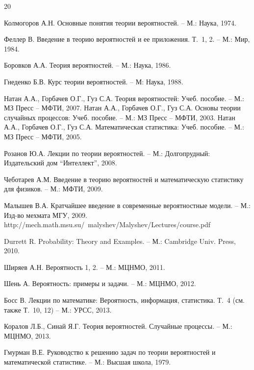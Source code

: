 \newpage


\renewcommand\refname{Литература}
\makeatletter
\renewcommand{\@biblabel}[1]{#1.}
\makeatother

\begin{thebibliography} {20}


Колмогоров А.Н. Основные понятия теории вероятностей. – М.: Наука, 1974. 

Феллер В. Введение в теорию вероятностей и ее приложения. Т.~1, 2. – М.: Мир, 1984.

Боровков А.А. Теория вероятностей. – М.: Наука, 1986.

Гнеденко Б.В. Курс теории вероятностей. – М: Наука, 1988.

Натан А.А., Горбачев О.Г., Гуз С.А. Теория вероятностей: Учеб. пособие. – М.: МЗ Пресс – МФТИ, 2007. 
Натан А.А., Горбачев О.Г., Гуз С.А.  Основы теории случайных процессов: Учеб. пособие. – М.: МЗ Пресс – МФТИ, 2003.
Натан А.А., Горбачев О.Г., Гуз С.А. Математическая статистика: Учеб. пособие. – М.: МЗ Пресс – МФТИ, 2005.

Розанов Ю.А. Лекции по теории вероятностей. – М.: Долгопрудный: Издательский дом “Интеллект”, 2008. 



Чеботарев А.М.  Введение в теорию вероятностей и математическую статистику для физиков. – М.: МФТИ, 2009.

Малышев В.А. Кратчайшее введение в современные вероятностные модели. – М.: Изд-во мехмата МГУ, 2009. 
{\small http://mech.math.msu.su/~malyshev/Malyshev/Lectures/course.pdf}

 \label{durrett}
Durrett R. Probability: Theory and Examples. – М.: Cambridge Univ. Press, 2010.

 \label{chiraiev}
Ширяев А.Н. Вероятность 1, 2. – М.: МЦНМО, 2011.

Шень А. Вероятность: примеры и задачи. – М.: МЦНМО, 2012.

Босс В. Лекции по математике: Вероятность, информация, статистика. Т.~4 (см. также Т.~10, 12) – М.: УРСС, 2013.

Коралов Л.Б., Синай Я.Г. Теория вероятностей. Случайные процессы. – М.: МЦНМО, 2013.

Гмурман В.Е. Руководство к решению задач по теории вероятностей и математической статистике. – М.: Высшая школа, 1979. 


\end{thebibliography}

